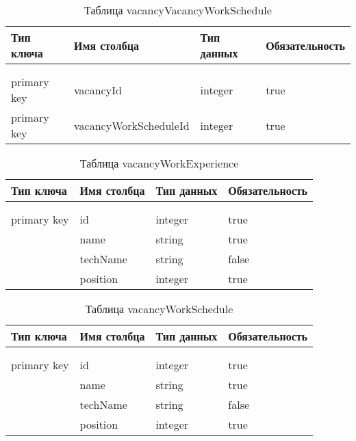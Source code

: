 \begin{xltabular}{\textwidth}{|l|l|p{1.7cm}|X|}
	\caption{Таблица vacancyVacancyWorkSchedule \label{vacancyVacancyWorkSchedule:table}}\\ \hline
	\centrow Тип ключа & \centrow Имя столбца & \centrow Тип данных & \centrow Обязательность \\ \hline
	 &  &  &  \\ \hline
	\endfirsthead
	 &  &  &  \\ \hline
	\finishhead
	primary key & vacancyId & integer & true \\ \hline 
	primary key & vacancyWorkScheduleId & integer & true \\ \hline
\end{xltabular}

\begin{xltabular}{\textwidth}{|l|l|p{1.7cm}|X|}
	\caption{Таблица vacancyWorkExperience \label{vacancyWorkExperience:table}}\\ \hline
	\centrow Тип ключа & \centrow Имя столбца & \centrow Тип данных & \centrow Обязательность \\ \hline
	 &  &  &  \\ \hline
	\endfirsthead
	 &  &  &  \\ \hline
	\finishhead
	primary key & id & integer & true \\ \hline 
	& name & string & true \\ \hline 
	& techName & string & false \\ \hline 
	& position & integer & true \\ \hline
\end{xltabular}

\begin{xltabular}{\textwidth}{|l|l|p{1.7cm}|X|}
	\caption{Таблица vacancyWorkSchedule \label{vacancyWorkSchedule:table}}\\ \hline
	\centrow Тип ключа & \centrow Имя столбца & \centrow Тип данных & \centrow Обязательность \\ \hline
	 &  &  &  \\ \hline
	\endfirsthead
	 &  &  &  \\ \hline
	\finishhead
	primary key & id & integer & true \\ \hline 
	& name & string & true \\ \hline 
	& techName & string & false \\ \hline 
	& position & integer & true \\ \hline
\end{xltabular}
